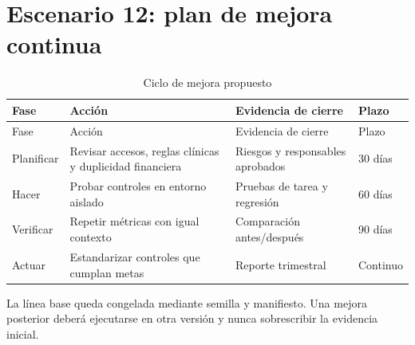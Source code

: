 \chapter{Escenario 12: plan de mejora continua}

\begin{longtable}{p{}p{}p{}p{}}
\caption{Ciclo de mejora propuesto}\\\toprule
Fase & Acción & Evidencia de cierre & Plazo\\\midrule\endfirsthead
\toprule Fase & Acción & Evidencia de cierre & Plazo\\\midrule\endhead
Planificar & Revisar accesos, reglas clínicas y duplicidad financiera & Riesgos y responsables aprobados & 30 días\\
Hacer & Probar controles en entorno aislado & Pruebas de tarea y regresión & 60 días\\
Verificar & Repetir métricas con igual contexto & Comparación antes/después & 90 días\\
Actuar & Estandarizar controles que cumplan metas & Reporte trimestral & Continuo\\\bottomrule
\end{longtable}

La línea base queda congelada mediante semilla y manifiesto. Una mejora posterior deberá ejecutarse en otra versión y nunca sobrescribir la evidencia inicial.
